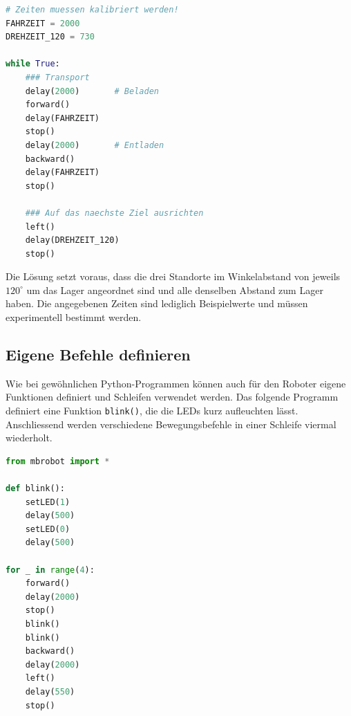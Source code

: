 \begin{myexercise}
\begin{myanswer}
\begin{lstlisting}[language=Python]
# Zeiten muessen kalibriert werden!
FAHRZEIT = 2000
DREHZEIT_120 = 730

while True:
    ### Transport
    delay(2000)       # Beladen
    forward()
    delay(FAHRZEIT)
    stop()
    delay(2000)       # Entladen
    backward()
    delay(FAHRZEIT)
    stop()

    ### Auf das naechste Ziel ausrichten
    left()
    delay(DREHZEIT_120)
    stop()
        \end{lstlisting}

        Die Lösung setzt voraus, dass die drei Standorte
        im Winkelabstand von jeweils \(120^\circ\) um
        das Lager angeordnet sind und alle denselben
        Abstand zum Lager haben. Die angegebenen Zeiten
        sind lediglich Beispielwerte und müssen
        experimentell bestimmt werden.
    \end{myanswer}
\end{myexercise}


\subsection*{Eigene Befehle definieren}


Wie bei gewöhnlichen Python-Programmen können auch für
den Roboter eigene Funktionen definiert und Schleifen
verwendet werden. Das folgende Programm definiert eine
Funktion \texttt{blink()}, die die LEDs kurz aufleuchten
lässt. Anschliessend werden verschiedene Bewegungsbefehle
in einer Schleife viermal wiederholt.

\begin{lstlisting}[language=Python]
from mbrobot import *

def blink():
    setLED(1)
    delay(500)
    setLED(0)
    delay(500)

for _ in range(4):
    forward()
    delay(2000)
    stop()
    blink()
    blink()
    backward()
    delay(2000)
    left()
    delay(550)
    stop()
\end{lstlisting}

